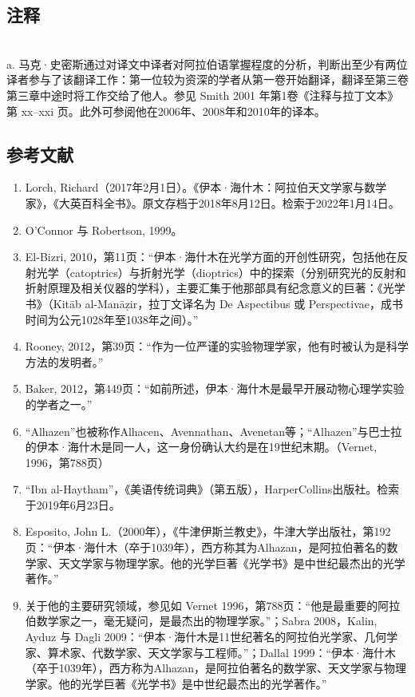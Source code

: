 \subsection{注释}\\
a. 马克·史密斯通过对译文中译者对阿拉伯语掌握程度的分析，判断出至少有两位译者参与了该翻译工作：第一位较为资深的学者从第一卷开始翻译，翻译至第三卷第三章中途时将工作交给了他人。参见 Smith 2001 年第1卷《注释与拉丁文本》第 xx–xxi 页。此外可参阅他在2006年、2008年和2010年的译本。
\subsection{参考文献}
\begin{enumerate}
\item Lorch, Richard（2017年2月1日）。《伊本·海什木：阿拉伯天文学家与数学家》，《大英百科全书》。原文存档于2018年8月12日。检索于2022年1月14日。
\item O'Connor 与 Robertson, 1999。
\item El-Bizri, 2010，第11页：“伊本·海什木在光学方面的开创性研究，包括他在反射光学（catoptrics）与折射光学（dioptrics）中的探索（分别研究光的反射和折射原理及相关仪器的学科），主要汇集于他那部具有纪念意义的巨著：《光学书》（Kitāb al-Manāẓir，拉丁文译名为 De Aspectibus 或 Perspectivae，成书时间为公元1028年至1038年之间）。”
\item Rooney, 2012，第39页：“作为一位严谨的实验物理学家，他有时被认为是科学方法的发明者。”
\item Baker, 2012，第449页：“如前所述，伊本·海什木是最早开展动物心理学实验的学者之一。”
\item “Alhazen”也被称作Alhacen、Avennathan、Avenetan等；“Alhazen”与巴士拉的伊本·海什木是同一人，这一身份确认大约是在19世纪末期。（Vernet, 1996，第788页）
\item “Ibn al-Haytham”，《美语传统词典》（第五版），HarperCollins出版社。检索于2019年6月23日。
\item Esposito, John L.（2000年），《牛津伊斯兰教史》，牛津大学出版社，第192页：“伊本·海什木（卒于1039年），西方称其为Alhazan，是阿拉伯著名的数学家、天文学家与物理学家。他的光学巨著《光学书》是中世纪最杰出的光学著作。”
\item 关于他的主要研究领域，参见如 Vernet 1996，第788页：“他是最重要的阿拉伯数学家之一，毫无疑问，是最杰出的物理学家。”；Sabra 2008，Kalin, Ayduz 与 Dagli 2009：“伊本·海什木是11世纪著名的阿拉伯光学家、几何学家、算术家、代数学家、天文学家与工程师。”；Dallal 1999：“伊本·海什木（卒于1039年），西方称为Alhazan，是阿拉伯著名的数学家、天文学家与物理学家。他的光学巨著《光学书》是中世纪最杰出的光学著作。”

\end{enumerate}
